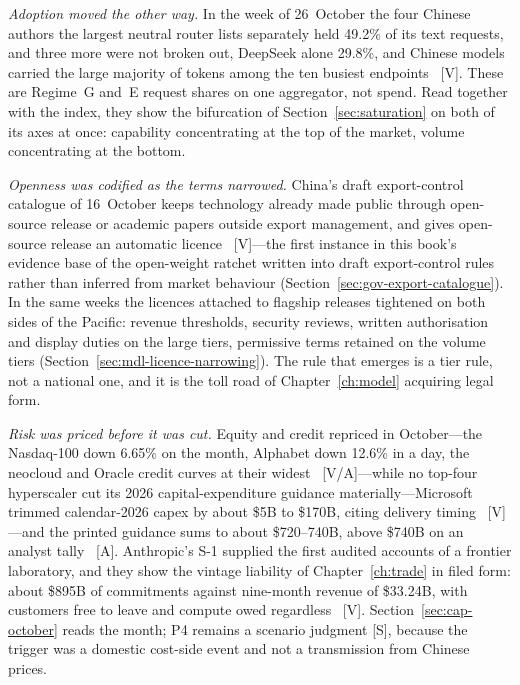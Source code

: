 \emph{Adoption moved the other way.} In the week of 26~October the four Chinese authors the largest neutral router lists separately held 49.2\% of its text requests, and three more were not broken out, DeepSeek alone 29.8\%, and Chinese models carried the large majority of tokens among the ten busiest endpoints~\cite{mdl-openrouter-oct26} [V]. These are Regime~G and~E request shares on one aggregator, not spend. Read together with the index, they show the bifurcation of Section~\ref{sec:saturation} on both of its axes at once: capability concentrating at the top of the market, volume concentrating at the bottom.

\emph{Openness was codified as the terms narrowed.} China's draft export-control catalogue of 16~October keeps technology already made public through open-source release or academic papers outside export management, and gives open-source release an automatic licence~\cite{gov-mofcom-catalogue} [V]---the first instance in this book's evidence base of the open-weight ratchet written into draft export-control rules rather than inferred from market behaviour (Section~\ref{sec:gov-export-catalogue}). In the same weeks the licences attached to flagship releases tightened on both sides of the Pacific: revenue thresholds, security reviews, written authorisation and display duties on the large tiers, permissive terms retained on the volume tiers (Section~\ref{sec:mdl-licence-narrowing}). The rule that emerges is a tier rule, not a national one, and it is the toll road of Chapter~\ref{ch:model} acquiring legal form.

\emph{Risk was priced before it was cut.} Equity and credit repriced in October---the Nasdaq-100 down 6.65\% on the month, Alphabet down 12.6\% in a day, the neocloud and Oracle credit curves at their widest~\cite{cap-nasdaq-oct,cap-alphabet-q3,cap-coreweave-oct,cap-oracle-cds-oct} [V/A]---while no top-four hyperscaler cut its 2026 capital-expenditure guidance materially---Microsoft trimmed calendar-2026 capex by about \$5B to \$170B, citing delivery timing~\cite{cap-msft-fq1} [V]---and the printed guidance sums to about \$720--740B, above \$740B on an analyst tally~\cite{cap-capex-tally} [A]. Anthropic's S-1 supplied the first audited accounts of a frontier laboratory, and they show the vintage liability of Chapter~\ref{ch:trade} in filed form: about \$895B of commitments against nine-month revenue of \$33.24B, with customers free to leave and compute owed regardless~\cite{cap-anthropic-s1} [V]. Section~\ref{sec:cap-october} reads the month; P4 remains a scenario judgment [S], because the trigger was a domestic cost-side event and not a transmission from Chinese prices.

